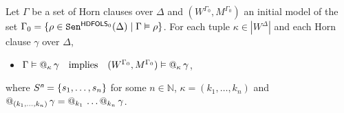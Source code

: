 \documentclass[a4paper,UKenglish,cleveref,autoref]{lipics-v2019}
\begin{document}
\begin{proposition}
  \label{proposition:init}
  Let\/ $\Gamma$ be a set of Horn clauses over $\Delta$ and $(W^{\Gamma_{0}}, M^{\Gamma_{0}})$ an initial model of the set\/
  $\Gamma_{0} = \{\rho \in \mathtt{Sen}^{{\mathsf{HDFOLS}}_{0}}(\Delta) \mid \Gamma \vDash \rho\}$.
  For each tuple $\kappa\in|W^{\Delta}|$ and each Horn clause $\gamma$ over $\Delta$,
  \begin{itemize}
   \item 
    $\Gamma \vDash @_{\kappa}\, \gamma
    \quad\text{implies}\quad
    (W^{\Gamma_{0}}, M^{\Gamma_{0}}) \vDash @_{\kappa}\, \gamma$,
   \end{itemize} 
  where $S^{\text{\normalfont\sffamily\itshape n}}=\{s_1,\dots,s_n\}$ for some $n\in\mathbb{N}$, $\kappa=(k_1,\dots,k_n)$ and $\at{(k_1,\dots,k_n)}\gamma=\at{k_1}\dots\at{k_n}\gamma$.
\end{proposition}
\end{document}
